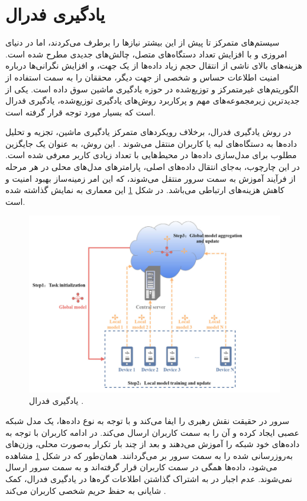 \section{
	یادگیری فدرال%
}
سیستم‌های متمرکز تا پیش از این بیشتر نیازها را برطرف می‌کردند، اما در دنیای امروزی و با افزایش تعداد دستگاه‌های متصل، چالش‌های جدیدی مطرح شده است. هزینه‌های بالای ناشی از انتقال حجم زیاد داده‌ها از یک جهت، و افزایش نگرانی‌ها درباره امنیت اطلاعات حساس و شخصی از جهت دیگر، محققان را به سمت استفاده از الگوریتم‌های غیرمتمرکز و توزیع‌شده در حوزه یادگیری ماشین سوق داده است. یکی از جدیدترین زیرمجموعه‌های مهم و پرکاربرد روش‌های یادگیری توزیع‌شده، یادگیری فدرال است که بسیار مورد توجه قرار گرفته است.


در روش یادگیری فدرال، برخلاف رویکردهای متمرکز یادگیری ماشین، تجزیه و تحلیل داده‌ها به دستگاه‌های لبه%
یا کاربران%
منتقل می‌شوند
\cite{ma2022state}.
این روش، به عنوان یک جایگزین مطلوب برای مدل‌سازی داده‌ها در محیط‌هایی با تعداد زیادی کاربر معرفی شده است. در این چارچوب، به‌جای انتقال داده‌های اصلی، پارامترهای مدل‌های محلی در هر مرحله از فرآیند آموزش به سمت سرور منتقل می‌شوند، که این امر زمینه‌ساز بهبود امنیت و کاهش هزینه‌های ارتباطی می‌باشد.
در شکل
\ref{federated_learning}
این معماری به نمایش گذاشته شده است.


 \begin{figure}[t!]
	\centering
	\includegraphics[scale=0.595]{images/chap1/federated_learning.png}%
	\caption{%
		یادگیری فدرال 
		\cite{ma2022state}%
		.
	}
	\label{federated_learning}
	\centering
\end{figure}

سرور در حقیقت نقش رهبری را ایفا می‌کند و با توجه به نوع داده‌ها، یک مدل شبکه عصبی%
ایجاد کرده و آن را به سمت کاربران ارسال می‌کند. در ادامه کاربران با توجه به داده‌های خود شبکه را آموزش می‌دهند و بعد از چند بار تکرار به‌صورت محلی، وزن‌های به‌روزرسانی شده را به سمت سرور بر می‌گردانند. همان‌طور که در شکل
\ref{federated_learning}
مشاهده می‌شود، داده‌ها همگی در سمت کاربران قرار گرفته‌اند و به سمت سرور ارسال نمی‌شوند. عدم اجبار در به اشتراک گذاشتن اطلاعات گره‌ها در یادگیری فدرال، کمک شایانی به حفظ حریم شخصی کاربران می‌کند
\cite{smith2017federated}.



